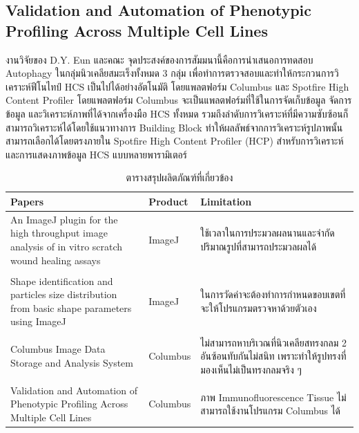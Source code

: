 \documentclass[12pt,oneside,openright,a4paper]{cpe-thai-project}
\begin{document}
\subsection{Validation and Automation of Phenotypic Profiling Across Multiple Cell Lines}
งานวิจัยของ  D.Y. Eun และคณะ \cite{36} จุดประสงค์ของการสัมมนานี้คือการนำเสนอการทดสอบ Autophagy ในกลุ่มนิวเคลียสมะเร็งทั้งหมด 3 กลุ่ม เพื่อทำการตรวจสอบและทำให้กระกวนการวิเคราะห์ฟีโนไทป์ HCS เป็นไปได้อย่างอัตโนมัติ โดยแพลตฟอร์ม Columbus และ Spotfire High Content Profiler โดยแพลตฟอร์ม Columbus จะเป็นแพลตฟอร์มที่ใช้ในการจัดเก็บข้อมูล จัดการข้อมูล และวิเคราะห์ภาพที่ได้จากเครื่องมือ HCS ทั้งหมด รวมถึงลำดับการวิเคราะห์ที่มีความซับซ้อนก็สามารถวิเคราะห์ได้โดยใช้แนวทางการ Building Block ทำให้ผลลัพธ์จากการวิเคราะห์รูปภาพนั้น สามารถเลือกได้โดยตรงภายใน Spotfire High Content Profiler (HCP) สำหรับการวิเคราะห์และการแสดงภาพข้อมูล HCS แบบหลายพารามิเตอร์ 

\begin{table}[ht!]
\caption{ตารางสรุปผลิตภัณฑ์ที่เกี่ยวข้อง}\label{tbl:product}
\begin{tabular}{p{}>{\centering}p{}>{\raggedright\arraybackslash}p{}}
\toprule
Papers          & Product    & Limitation \\ \midrule
An ImageJ plugin for the high throughput image analysis of in vitro scratch wound healing assays \cite{34} & ImageJ      &  ใช้เวลาในการประมวลผลนานและจำกัดปริมาณรูปที่สามารถประมวลผลได้     \\&&\\
Shape identification and particles size distribution from basic shape parameters using ImageJ \cite{35} & ImageJ       & ในการวัดค่าจะต้องทำการกำหนดขอบเขตที่จะให้โปรแกรมตรวจหาด้วยตัวเอง     \\
&&\\ Columbus Image Data Storage and Analysis System \cite{11}       & Columbus     & ไม่สามารถหาบริเวณที่นิวเคลียสทรงกลม 2 อันซ้อนทับกันไม่สนิท เพราะทำให้รูปทรงที่มองเห็นไม่เป็นทรงกลมจริง ๆ      \\&&\\
Validation and Automation of Phenotypic Profiling Across Multiple Cell Lines    \cite{36}               & Columbus   & ภาพ Immunofluorescence Tissue ไม่สามารถใช้งานโปรแกรม Columbus ได้     \\ \bottomrule
\end{tabular}
\end{table}

\end{document}
